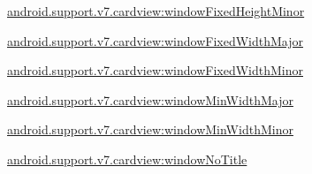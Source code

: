 {\ttfamily \hyperlink{classandroid_1_1support_1_1v7_1_1cardview_1_1R_1_1styleable_aab3ebd33291947ab919499cc329066b8}{android.\+support.\+v7.\+cardview\+:window\+Fixed\+Height\+Minor}}

{\ttfamily \hyperlink{classandroid_1_1support_1_1v7_1_1cardview_1_1R_1_1styleable_a37df104b2e08a0fd323610c8ceb0e98a}{android.\+support.\+v7.\+cardview\+:window\+Fixed\+Width\+Major}}

{\ttfamily \hyperlink{classandroid_1_1support_1_1v7_1_1cardview_1_1R_1_1styleable_a945c5aca64da7f328f2b9028ae826f73}{android.\+support.\+v7.\+cardview\+:window\+Fixed\+Width\+Minor}}

{\ttfamily \hyperlink{classandroid_1_1support_1_1v7_1_1cardview_1_1R_1_1styleable_a3d9fe7753815eb3cf40acf6790e1dd68}{android.\+support.\+v7.\+cardview\+:window\+Min\+Width\+Major}}

{\ttfamily \hyperlink{classandroid_1_1support_1_1v7_1_1cardview_1_1R_1_1styleable_aa1098644aec6afc914db566e8faa7357}{android.\+support.\+v7.\+cardview\+:window\+Min\+Width\+Minor}}

{\ttfamily \hyperlink{classandroid_1_1support_1_1v7_1_1cardview_1_1R_1_1styleable_af1f90e0bb899d8d3fc975f88951bf9c2}{android.\+support.\+v7.\+cardview\+:window\+No\+Title}}

